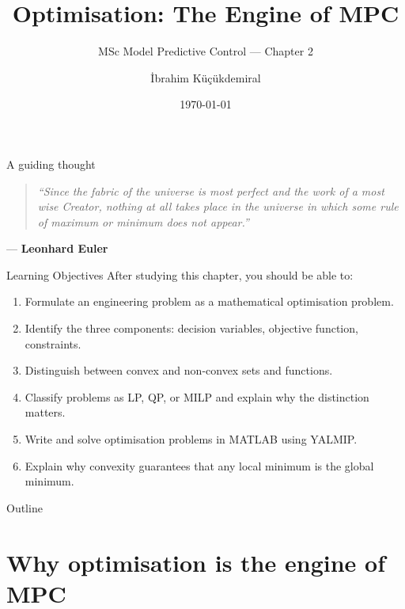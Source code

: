 \documentclass[aspectratio=169,10pt]{beamer}
\title[Optimisation (MPC Ch.2)]{Optimisation: The Engine of MPC}
\subtitle{MSc Model Predictive Control --- Chapter 2}
\author{\.Ibrahim K\"u\c c\"ukdemiral}
\institute{Glasgow Caledonian University}
\date{\today}
\begin{document}
\begin{frame}
  \titlepage
\end{frame}

\begin{frame}{A guiding thought}
\begin{quote}
\itshape
``Since the fabric of the universe is most perfect and the work of a most wise Creator,
nothing at all takes place in the universe in which some rule of maximum or minimum does not appear.''
\end{quote}
\hfill --- \textbf{Leonhard Euler}
\end{frame}

\begin{frame}{Learning Objectives}
After studying this chapter, you should be able to:
\begin{enumerate}
  \item Formulate an engineering problem as a mathematical optimisation problem.
  \item Identify the three components: decision variables, objective function, constraints.
  \item Distinguish between convex and non-convex sets and functions.
  \item Classify problems as LP, QP, or MILP and explain why the distinction matters.
  \item Write and solve optimisation problems in MATLAB using YALMIP.
  \item Explain why convexity guarantees that any local minimum is the global minimum.
\end{enumerate}
\end{frame}

\begin{frame}{Outline}
\tableofcontents
\end{frame}

\section{Why optimisation is the engine of MPC}
\end{document}

